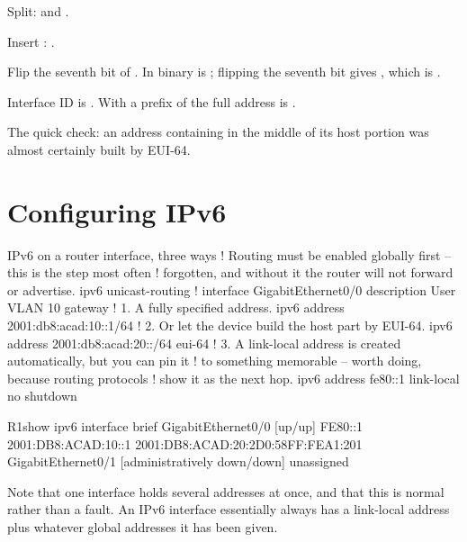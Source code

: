 \begin{worked}
\begin{tightnum}
  \item Split:  and .
  \item Insert : .
  \item Flip the seventh bit of . In binary  is
        ; flipping the seventh bit gives , which
        is .
  \item Interface ID is . With a prefix of
         the full address is
        .
\end{tightnum}
The quick check: an address containing  in the middle of its host
portion was almost certainly built by EUI-64.
\end{worked}

\section{Configuring IPv6}

\begin{config}{IPv6 on a router interface, three ways}
! Routing must be enabled globally first -- this is the step most often
! forgotten, and without it the router will not forward or advertise.
ipv6 unicast-routing
!
interface GigabitEthernet0/0
 description User VLAN 10 gateway
 ! 1. A fully specified address.
 ipv6 address 2001:db8:acad:10::1/64
 ! 2. Or let the device build the host part by EUI-64.
 ipv6 address 2001:db8:acad:20::/64 eui-64
 ! 3. A link-local address is created automatically, but you can pin it
 !    to something memorable -- worth doing, because routing protocols
 !    show it as the next hop.
 ipv6 address fe80::1 link-local
 no shutdown
\end{config}

\begin{verify}{R1}{show ipv6 interface brief}
GigabitEthernet0/0     [up/up]
    FE80::1
    2001:DB8:ACAD:10::1
    2001:DB8:ACAD:20:2D0:58FF:FEA1:201
GigabitEthernet0/1     [administratively down/down]
    unassigned
\end{verify}

Note that one interface holds several addresses at once, and that this is normal
rather than a fault. An IPv6 interface essentially always has a link-local
address plus whatever global addresses it has been given.


